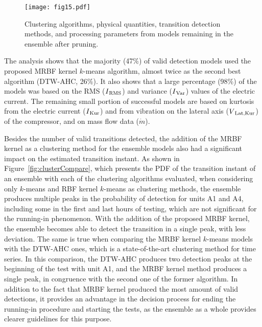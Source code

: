 \documentclass[preprint,11pt,number]{elsarticle}
\begin{document}
\begin{figure}[htb] 
\begin{center}
\texttt{[image: fig15.pdf]}    %
\caption{Clustering algorithms, physical quantities, transition detection methods, and processing parameters from models remaining in the ensemble after pruning.} 
\label{fig:pieA}
\end{center}
\end{figure}

The analysis shows that the majority (47\%) of valid detection models used the proposed MRBF kernel $k$-means algorithm, almost twice as the second best algorithm (DTW-AHC, 26\%). It also shows that a large percentage (98\%) of the models was based on the RMS ($I\textsubscript{RMS}$) and variance ($I\textsubscript{Var}$) values of the electric current. The remaining small portion of successful models are based on kurtosis from the electric current ($I\textsubscript{Kur}$) and from vibration on the lateral axis ($V\textsubscript{Lat,Kur}$) of the compressor, and on mass flow data ($\dot{m}$).

Besides the number of valid transitions detected, the addition of the MRBF kernel as a clustering method for the ensemble models also had a significant impact on the estimated transition instant. As shown in Figure~\ref{fig:clusterCompare}, which presents the PDF of the transition instant of an ensemble with each of the clustering algorithms evaluated, when considering only $k$-means and RBF kernel $k$-means as clustering methods, the ensemble produces multiple peaks in the probability of detection for units A1 and A4, including some in the first and last hours of testing, which are not significant for the running-in phenomenon. With the addition of the proposed MRBF kernel, the ensemble becomes able to detect the transition in a single peak, with less deviation. The same is true when comparing the MRBF kernel $k$-means models with the DTW-AHC ones, which is a state-of-the-art clustering method for time series. In this comparison, the DTW-AHC produces two detection peaks at the beginning of the test with unit A1, and the MRBF kernel method produces a single peak, in congruence with the second one of the former algorithm. In addition to the fact that MRBF kernel produced the most amount of valid detections, it provides an advantage in the decision process for ending the running-in procedure and starting the tests, as the ensemble as a whole provides clearer guidelines for this purpose.
\end{document}

